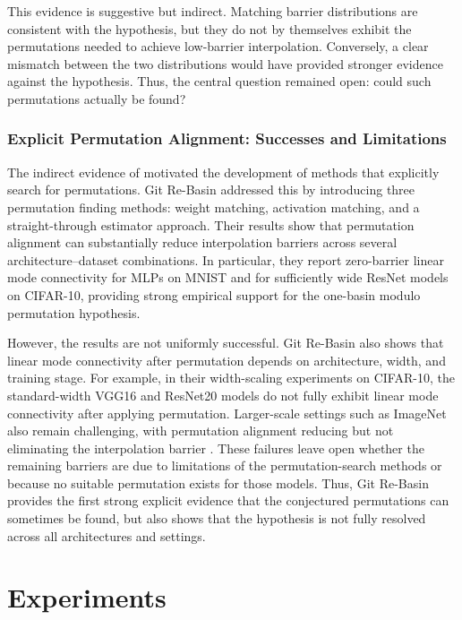 \documentclass[11pt,a4paper]{report}
\begin{document}
This evidence is suggestive but indirect. Matching barrier distributions are
consistent with the hypothesis, but they do not by themselves exhibit the
permutations needed to achieve low-barrier interpolation. Conversely, a clear
mismatch between the two distributions would have provided stronger evidence
against the hypothesis. Thus, the central question remained open: could such
permutations actually be found?

\subsection{Explicit Permutation Alignment: Successes and Limitations}

The indirect evidence of \citet{entezari2021role} motivated the development of
methods that explicitly search for permutations. Git Re-Basin addressed this by
introducing three permutation finding methods: weight matching, activation
matching, and a straight-through estimator approach. Their results
show that permutation alignment can substantially reduce interpolation barriers
across several architecture--dataset combinations. In particular, they report
zero-barrier linear mode connectivity for MLPs on MNIST and for sufficiently wide
ResNet models on CIFAR-10, providing strong empirical support for the one-basin
modulo permutation hypothesis.

However, the results are not uniformly successful. Git Re-Basin also shows that
linear mode connectivity after permutation depends on architecture, width, and
training stage. For example, in their width-scaling experiments on CIFAR-10, the
standard-width VGG16 and ResNet20 models do not fully exhibit linear mode
connectivity after applying permutation. Larger-scale settings such as
ImageNet also remain challenging, with permutation alignment reducing but not
eliminating the interpolation barrier \citet{ainsworth2023git}. These failures
leave open whether the remaining barriers are due to limitations of the
permutation-search methods or because no suitable permutation exists for those
models. Thus, Git Re-Basin provides the first strong explicit evidence that the
conjectured permutations can sometimes be found, but also shows that the
hypothesis is not fully resolved across all architectures and settings.


\chapter{Experiments}
\end{document}
